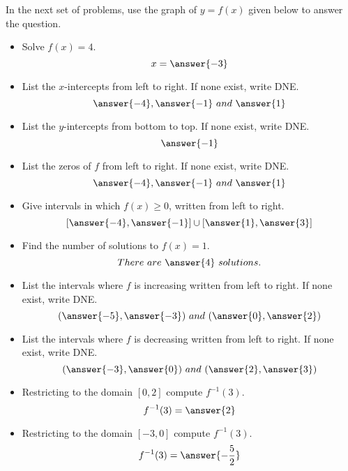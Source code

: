 \documentclass{ximera}
\author{Carl Stitz \and Jeff Zeager \and Bart Snapp \and Matthew Carr\and Nela Lakos}
\begin{document}
\begin{exercise}
In the next set of problems, use the graph of $y = f(x)$ given below
to answer the question.
\begin{image}
\end{image}
\begin{itemize}
\item Solve $f(x) = 4$. \[x=\answer{-3}\]
\item List the $x$-intercepts from left to right. If none exist, write
  DNE. \[\answer{-4}, \answer{-1}\ and\ \answer{1}\]
\item List the $y$-intercepts from bottom to top. If none exist, write
  DNE. \[\answer{-1}\]
\item List the zeros of $f$ from left to right. If none exist, write
  DNE. \[\answer{-4}, \answer{-1}\ and\ \answer{1}\]
\item Give intervals in which $f(x) \geq 0$, written from left to right. \[[\answer{-4},\answer{-1}]\cup[\answer{1},\answer{3}]\]
\item Find the number of solutions to $f(x) = 1$. \[There\ are\ \answer{4}\ solutions.\]
\item List the intervals where $f$ is increasing written from left to right. If none exist, write DNE. \[(\answer{-5},\answer{-3})\ and\ (\answer{0},\answer{2})\]
\item List the intervals where $f$ is decreasing written from left to right. If none exist, write DNE. \[(\answer{-3},\answer{0})\ and\ (\answer{2},\answer{3})\]
\item Restricting to the domain $[0,2]$ compute $f^{-1}(3)$. \[f^{-1}(3)=\answer{2}\]
\item Restricting to the domain $[-3,0]$ compute $f^{-1}(3)$. \[f^{-1}(3)=\answer{-\frac{5}{2}}\]
\end{itemize}
\end{exercise}
\end{document}
